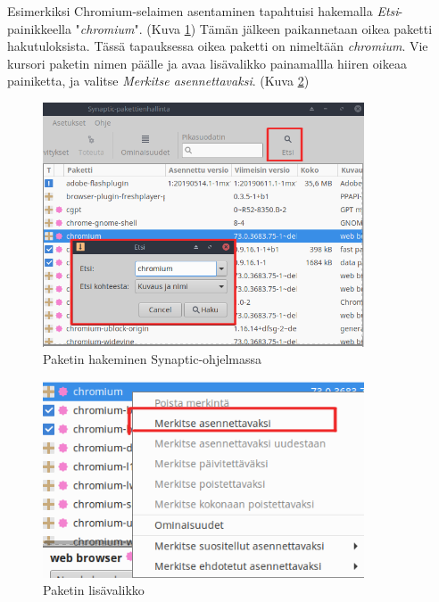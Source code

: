 \documentclass[a4paper, 12pt, finnish]{article}
\begin{document}
Esimerkiksi Chromium-selaimen asentaminen tapahtuisi hakemalla \textit{Etsi}-painikkeella "\textit{chromium}". (Kuva \ref{fig:chro_haku}) 
Tämän jälkeen paikannetaan oikea paketti hakutuloksista. Tässä tapauksessa oikea paketti on nimeltään \textit{chromium}. Vie kursori paketin nimen päälle ja avaa lisävalikko painamallla hiiren oikeaa painiketta, ja valitse \textit{Merkitse asennettavaksi}. (Kuva \ref{fig:chro_menu})

\begin{figure}[htpb]
    \begin{center}
        \includegraphics[width=0.85\textwidth]{ymparisto/chro_haku}
        \caption{Paketin hakeminen Synaptic-ohjelmassa}
        \label{fig:chro_haku}
    \end{center}
\end{figure}

\begin{figure}[htpb]
    \begin{center}
        \includegraphics[width=0.85\textwidth]{ymparisto/chro_menu}
        \caption{Paketin lisävalikko}
        \label{fig:chro_menu}
    \end{center}
\end{figure}
\clearpage
\end{document}
